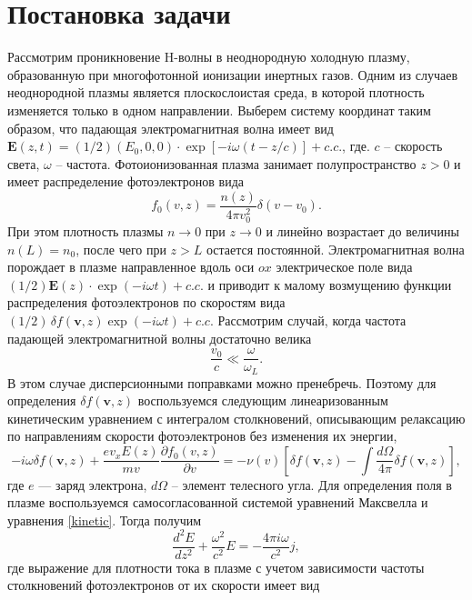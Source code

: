 \documentclass[12pt,a4paper]{article}
\numberwithin{equation}{section}
\begin{document}
\section{Постановка задачи}
Рассмотрим проникновение H-волны в неоднородную холодную плазму, образованную при многофотонной ионизации инертных газов. Одним из случаев неоднородной плазмы является плоскослоистая среда, в которой плотность изменяется только в одном направлении. Выберем систему координат таким образом, что падающая электромагнитная волна имеет вид $\bm{E}\left(z,t\right) =(1/2)\left(E_0,0,0\right)\cdot\exp\left[-i\omega\left(t-z/c\right)\right]+c.c.$, где. $c$ -- скорость света,  $\omega$ -- частота. Фотоионизованная плазма занимает полупространство $z>0$ и имеет распределение фотоэлектронов вида 
\begin{equation}
\label{fr}
    f_0(v, z) = \frac{n\left(z\right)}{4\pi v_0^2}\delta\left(v-v_0\right).
\end{equation}
При этом плотность плазмы $n\to 0$ при $z\to0$ и линейно возрастает до величины $n\left(L\right) = n_0$, после чего при $z>L$ остается постоянной. Электромагнитная волна порождает в плазме направленное вдоль оси $ox$ электрическое поле вида $(1/2)\bm{E}\left(z\right)\cdot\exp\left(-i\omega t\right)+c.c.$ и приводит к малому возмущению функции распределения фотоэлектронов по скоростям вида $(1/2)\,\delta f(\mathbf v,z)\exp\left(-i\omega t\right)+c.c$. Рассмотрим случай, когда частота падающей электромагнитной волны достаточно велика $$ \frac{v_0}{c}\ll \frac{\omega}{\omega_L}.$$ В этом случае дисперсионными поправками можно пренебречь. Поэтому для определения $\delta f\left(\mathbf v,z\right)$ воспользуемся следующим линеаризованным кинетическим уравнением с интегралом столкновений, описывающим релаксацию по направлениям скорости фотоэлектронов без изменения их энергии,
\begin{equation}
\label{kinetic}
    -i\omega\delta f(\mathbf v,z)+\frac{ev_x E\left(z\right)}{mv}\frac{\partial f_0(v, z)}{\partial v}= -\nu\left(v\right) \left[\delta f(\mathbf v,z)-\int \frac{d\Omega}{4\pi}\delta f(\mathbf v,z)\right],
\end{equation}
где $e$ — заряд электрона, $d\Omega$ -- элемент телесного угла.
Для определения поля в плазме воспользуемся самосогласованной системой уравнений Максвелла и уравнения \eqref{kinetic}. Тогда получим
\begin{equation}
    \label{field}
    \frac{d^2E}{dz^2}+\frac{\omega^2}{c^2}E = -\frac{4\pi i \omega}{c^2}j,
\end{equation}
где выражение для плотности тока в плазме с учетом зависимости частоты столкновений фотоэлектронов от их скорости имеет вид
\end{document}
